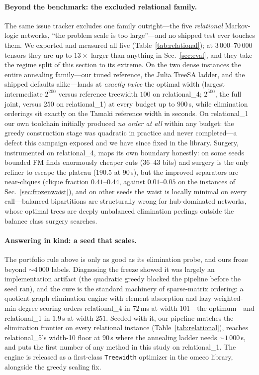 \documentclass{SciPost}
\begin{document}
\paragraph{Beyond the benchmark: the excluded relational family.}
The same issue tracker \cite{roa_2022_ti_issue15} excludes one family
outright---the five \emph{relational} Markov-logic networks, ``the
problem scale is too large''---and no shipped test ever touches them. We
exported and measured all five (Table~\ref{tab:relational}); at
$3\,000$--$70\,000$ tensors they are up to $13\times$ larger than
anything in Sec.~\ref{sec:eval}, and they take the regime split of this
section to its extreme. On the two dense instances the entire
annealing family---our tuned reference, the Julia TreeSA ladder, and
the shipped defaults alike---lands at \emph{exactly twice} the optimal
width (largest intermediate $2^{200}$ versus reference treewidth $100$
on relational\_4; $2^{500}$, the full joint, versus $250$ on
relational\_1) at every budget up to $900$\,s, while elimination
orderings sit exactly on the Tamaki reference width in seconds. On
relational\_1 our own toolchain initially produced \emph{no order at
all} within any budget: the greedy construction stage was quadratic in
practice and never completed---a defect this campaign exposed and we
have since fixed in the library. Surgery, instrumented on
relational\_4, maps its own boundary honestly: on some seeds bounded FM
finds enormously cheaper cuts ($36$--$43$ bits) and surgery is the only
refiner to escape the plateau ($190.5$ at $90$\,s), but the improved
separators are near-cliques (clique fraction $0.41$--$0.44$, against
$0.01$--$0.05$ on the instances of Sec.~\ref{sec:frozenwaist}), and on
other seeds the waist is locally minimal on every call---balanced
bipartitions are structurally wrong for hub-dominated networks, whose
optimal trees are deeply unbalanced elimination peelings outside the
balance class surgery searches.

\paragraph{Answering in kind: a seed that scales.}
The portfolio rule above is only as good as its elimination probe, and
ours froze beyond ${\sim}4\,000$ labels. Diagnosing the freeze showed it
was largely an implementation artifact (the quadratic greedy blocked
the pipeline before the seed ran), and the cure is the standard
machinery of sparse-matrix ordering: a quotient-graph elimination
engine with element absorption and lazy weighted-min-degree scoring
\cite{amestoy_1996_approximate} orders
relational\_4 in $72$\,ms at width $101$---the optimum---and
relational\_1 in $1.9$\,s at width $251$. Seeded with it, our pipeline
matches the elimination frontier on every relational instance
(Table~\ref{tab:relational}), reaches relational\_5's width-10 floor at
$90$\,s where the annealing ladder needs ${\sim}1\,000$\,s, and puts
the first number of any method in this study on relational\_1. The
engine is released as a first-class \texttt{Treewidth} optimizer in the
omeco library, alongside the greedy scaling fix.
\end{document}
